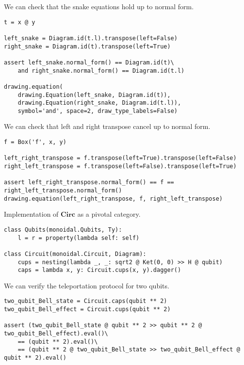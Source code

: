 \begin{example}
We can check that the snake equations hold up to normal form.

\begin{verbatim}
t = x @ y

left_snake = Diagram.id(t.l).transpose(left=False)
right_snake = Diagram.id(t).transpose(left=True)

assert left_snake.normal_form() == Diagram.id(t)\
    and right_snake.normal_form() == Diagram.id(t.l)

drawing.equation(
    drawing.Equation(left_snake, Diagram.id(t)),
    drawing.Equation(right_snake, Diagram.id(t.l)),
    symbol='and', space=2, draw_type_labels=False)
\end{verbatim}

\end{example}

\begin{example}
We can check that left and right transpose cancel up to normal form.

\begin{verbatim}
f = Box('f', x, y)

left_right_transpose = f.transpose(left=True).transpose(left=False)
right_left_transpose = f.transpose(left=False).transpose(left=True)

assert left_right_transpose.normal_form() == f == right_left_transpose.normal_form()
drawing.equation(left_right_transpose, f, right_left_transpose)
\end{verbatim}

\end{example}

\begin{python}
{\normalfont Implementation of $\mathbf{Circ}$ as a pivotal category.}

\begin{verbatim}
class Qubits(monoidal.Qubits, Ty):
    l = r = property(lambda self: self)

class Circuit(monoidal.Circuit, Diagram):
    cups = nesting(lambda _, _: sqrt2 @ Ket(0, 0) >> H @ qubit)
    caps = lambda x, y: Circuit.cups(x, y).dagger()
\end{verbatim}
\end{python}

\begin{example}
We can verify the teleportation protocol for two qubits.

\begin{verbatim}
two_qubit_Bell_state = Circuit.caps(qubit ** 2)
two_qubit_Bell_effect = Circuit.cups(qubit ** 2)

assert (two_qubit_Bell_state @ qubit ** 2 >> qubit ** 2 @ two_qubit_Bell_effect).eval()\
    == (qubit ** 2).eval()\
    == (qubit ** 2 @ two_qubit_Bell_state >> two_qubit_Bell_effect @ qubit ** 2).eval()
\end{verbatim}
\end{example}

